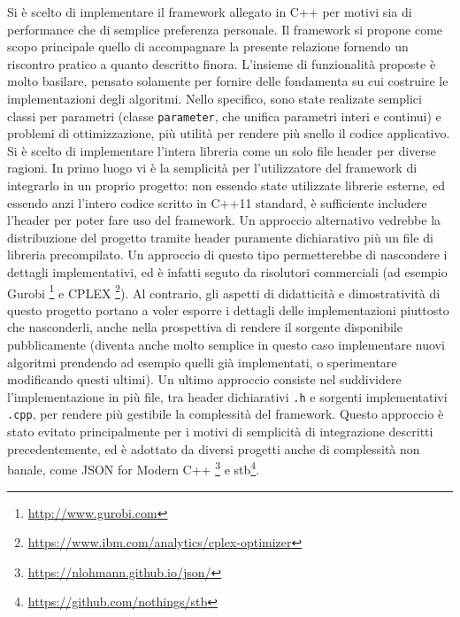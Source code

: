 \documentclass[12pt]{article}
\begin{document}
Si è scelto di implementare il framework allegato in C++ per motivi sia di performance che di semplice preferenza personale. Il framework si propone come scopo principale quello di accompagnare la presente relazione fornendo un riscontro pratico a quanto descritto finora. \newline 
L'insieme di funzionalità proposte è molto basilare, pensato solamente per fornire delle fondamenta su cui costruire le implementazioni degli algoritmi. Nello specifico, sono state realizate semplici classi per parametri (classe \texttt{parameter}, che unifica parametri interi e continui) e problemi di ottimizzazione, più utilità per rendere più snello il codice applicativo.\newline
\newline
Si è scelto di implementare l'intera libreria come un solo file header per diverse ragioni. In primo luogo vi è la semplicità per l'utilizzatore del framework di integrarlo in un proprio progetto: non essendo state utilizzate librerie esterne, ed essendo anzi l'intero codice scritto in C++11 standard, è sufficiente includere l'header per poter fare uso del framework. Un approccio alternativo vedrebbe la distribuzione del progetto tramite header puramente dichiarativo più un file di libreria precompilato. Un approccio di questo tipo permetterebbe di nascondere i dettagli implementativi, ed è infatti seguto da risolutori commerciali (ad esempio Gurobi \footnote{\url{http://www.gurobi.com}} e CPLEX \footnote{\url{https://www.ibm.com/analytics/cplex-optimizer}}). Al contrario, gli aspetti  di didatticità e dimostratività di questo progetto portano a voler esporre i dettagli delle implementazioni piuttosto che nasconderli, anche nella prospettiva di rendere il sorgente disponibile pubblicamente (diventa anche molto semplice in questo caso implementare nuovi algoritmi prendendo ad esempio quelli già implementati, o sperimentare modificando questi ultimi). \newline
Un ultimo approccio consiste nel suddividere l'implementazione in più file, tra header dichiarativi \texttt{.h} e sorgenti implementativi \texttt{.cpp}, per rendere più gestibile la complessità del framework. Questo approccio è stato evitato principalmente per i motivi di semplicità di integrazione descritti precedentemente, ed è adottato da diversi progetti anche di complessità non banale, come JSON for Modern C++ \footnote{\url{https://nlohmann.github.io/json/}} e stb\footnote{\url{https://github.com/nothings/stb}}.\newline
\end{document}
